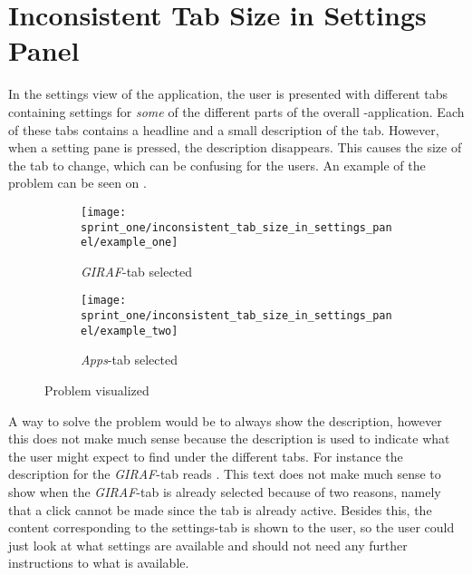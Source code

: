 
\section{Inconsistent Tab Size in Settings Panel}
\label{sec:inconsistent_tab_size_in_settings_panel}

In the settings view of the \launcher application, the user is presented with different tabs containing settings for \emph{some} of the different parts of the overall \giraf-application. Each of these tabs contains a headline and a small description of the tab. However, when a setting pane is pressed, the description disappears. This causes the size of the tab to change, which can be confusing for the users. An example of the problem can be seen on . \\

\begin{figure}[!htbp]
    \centering

    \begin{subfigure}[t]{0.3\textwidth}
        \texttt{[image: sprint\_one/inconsistent\_tab\_size\_in\_settings\_panel/example\_one]}
        \caption{\emph{GIRAF}-tab selected}
        \label{fig:inconsistent_tab_size_in_settings_panel_example_one}
    \end{subfigure}
    \hspace{5em} 
    \begin{subfigure}[t]{0.3\textwidth}
        \texttt{[image: sprint\_one/inconsistent\_tab\_size\_in\_settings\_panel/example\_two]}
        \caption{\emph{Apps}-tab selected}
        \label{fig:inconsistent_tab_size_in_settings_panel_example_two}
    \end{subfigure}
    
    \caption{Problem visualized}
    \label{fig:inconsistent_tab_size_in_settings_panel_example}
\end{figure}

A way to solve the problem would be to always show the description, however this does not make much sense because the description is used to indicate what the user might expect to find under the different tabs. For instance the description for the \emph{GIRAF}-tab reads . This text does not make much sense to show when the \emph{GIRAF}-tab is already selected because of two reasons, namely that a click cannot be made since the tab is already active. Besides this, the content corresponding to the settings-tab is shown to the user, so the user could just look at what settings are available and should not need any further instructions to what is available. \\

